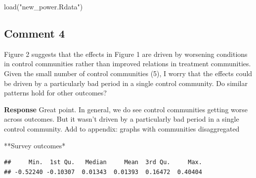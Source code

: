 \documentclass[
]{article}
\newenvironment{Shaded}{\begin{snugshade}}{\end{snugshade}}
\newcommand{\CommentTok}[1]{\textcolor[rgb]{0.56,0.35,0.01}{\textit{#1}}}
\newcommand{\DecValTok}[1]{\textcolor[rgb]{0.00,0.00,0.81}{#1}}
\newcommand{\DocumentationTok}[1]{\textcolor[rgb]{0.56,0.35,0.01}{\textbf{\textit{#1}}}}
\newcommand{\FunctionTok}[1]{\textcolor[rgb]{0.00,0.00,0.00}{#1}}
\newcommand{\NormalTok}[1]{#1}
\newcommand{\SpecialCharTok}[1]{\textcolor[rgb]{0.00,0.00,0.00}{#1}}
\newcommand{\StringTok}[1]{\textcolor[rgb]{0.31,0.60,0.02}{#1}}
\begin{document}
\begin{Shaded}
\begin{Highlighting}[]
\FunctionTok{load}\NormalTok{(}\StringTok{"new\_power.Rdata"}\NormalTok{)}
\end{Highlighting}
\end{Shaded}

\hypertarget{comment-4}{%
\subsection{Comment 4}\label{comment-4}}

Figure 2 suggests that the effects in Figure 1 are driven by worsening
conditions in control communities rather than improved relations in
treatment communities. Given the small number of control communities
(5), I worry that the effects could be driven by a particularly bad
period in a single control community. Do similar patterns hold for other
outcomes?

\textbf{Response} Great point. In general, we do see control communities
getting worse across outcomes. But it wasn't driven by a particularly
bad period in a single control community. Add to appendix: graphs with
communities disaggregated

**Survey outcomes*

\begin{Shaded}
\end{Shaded}

\begin{verbatim}
##     Min.  1st Qu.   Median     Mean  3rd Qu.     Max. 
## -0.52240 -0.10307  0.01343  0.01393  0.16472  0.40404
\end{verbatim}

\begin{Shaded}
\end{Shaded}
\end{document}
